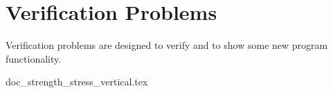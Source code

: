 
\section{Verification Problems}
\label{sec:verification_problems}

Verification problems are designed to verify and to show some new  program functionality.   


\clearpage


\clearpage

%

%

 {doc_strength_stress_vertical.tex}
\clearpage